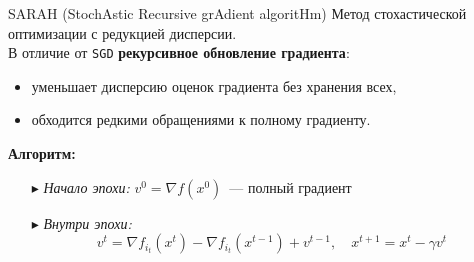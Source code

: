 \documentclass{beamer}
\theoremstyle{plain}
\begin{document}
\begin{frame}{SARAH (StochAstic Recursive grAdient algoritHm)}
    Метод стохастической оптимизации с редукцией дисперсии.\\
    \vspace{1.2em}
    В отличие от \texttt{SGD} \textbf{рекурсивное обновление градиента}:
    \begin{itemize}
        \item уменьшает дисперсию оценок градиента без хранения всех,
        \item обходится редкими обращениями к полному градиенту.
    \end{itemize}

    \vspace{1.2em}
    \textbf{Алгоритм:}
    \begin{itemize}
        \item[$\blacktriangleright$] \textit{Начало эпохи:} $v^0 = \nabla f(x^0)$~--- полный градиент
        \item[$\blacktriangleright$] \textit{Внутри эпохи:}
        \[
        v^t = \nabla f_{i_t}(x^t) - \nabla f_{i_t}(x^{t-1}) + v^{t-1}, \quad 
        x^{t+1} = x^t - \gamma v^t
        \]
    \end{itemize}

    \vfill
    \scriptsize
    \faBook~
\end{frame}
\end{document}
